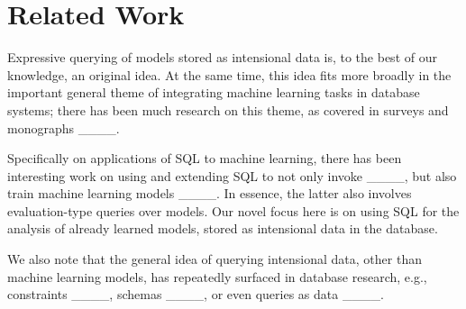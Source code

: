 \section{Related Work}
\label{secrel}

Expressive querying of models stored as intensional data is, to
the best of our knowledge, an original idea.  At the same time,
this idea fits more broadly in the important general theme of
integrating machine learning tasks in database systems; there has
been much research on this theme, as covered in surveys and
monographs ____.

Specifically on applications of SQL to machine learning, there
has been interesting work on using and extending SQL to not only
invoke ____, but also train machine learning models
____.  In essence, the
latter also involves evaluation-type queries over models.
Our novel focus here is on using SQL for the analysis of
already learned models, stored as intensional data in the
database.

We also note that the general idea of querying 
intensional data, other than machine
learning models, has repeatedly surfaced in database research,
e.g., constraints ____, schemas ____,
or even queries as data ____.